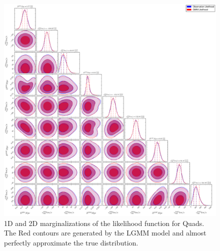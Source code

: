 \documentclass[iop,apj,twocolappendix,numberedappendix]{emulateapj}
\begin{document}
\begin{figure}
\includegraphics[width=\linewidth]{figures/LGMM.pdf}
\caption{1D and 2D marginalizations of the likelihood function for Quads. The Red contours are generated by the LGMM model and almost perfectly approximate the true distribution.}
\label{fig:LGMM}
\end{figure}
\end{document}
